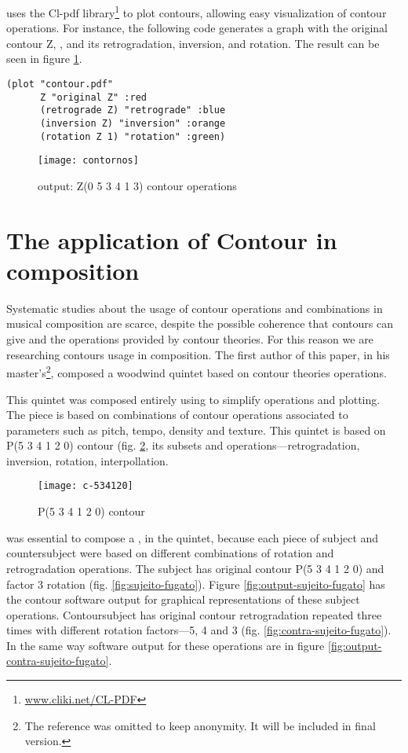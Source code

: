 \goiaba{} uses the Cl-pdf library\footnote{\url{www.cliki.net/CL-PDF}}
to plot contours, allowing easy visualization of contour operations.
For instance, the following code generates a graph with the original
contour Z, , and its retrogradation, inversion,
and rotation. The result can be seen in figure \ref{fig:operacoes}.

\begin{verbatim}
(plot "contour.pdf"
      Z "original Z" :red
      (retrograde Z) "retrograde" :blue
      (inversion Z) "inversion" :orange
      (rotation Z 1) "rotation" :green)
\end{verbatim}

\begin{figure}
  \centering
  \texttt{[image: contornos]}
  \caption{\goiaba{} output: Z(0 5 3 4 1 3) contour operations}
  \label{fig:operacoes}
\end{figure}


\section{The application of Contour in composition}
\label{sec:cont-appl-comp}

Systematic studies about the usage of contour operations and
combinations in musical composition are scarce, despite the possible
coherence that contours can give and the operations provided by
contour theories. For this reason we are researching contours usage in
composition. The first author of this paper, in his
master's\footnote{The reference was omitted to keep anonymity. It will
  be included in final version.}, composed a woodwind quintet based on
contour theories operations.

This quintet was composed entirely using \goiaba{} to simplify
operations and plotting. The piece is based on combinations of contour
operations associated to parameters such as pitch, tempo, density and
texture. This quintet is based on P(5 3 4 1 2 0) contour
(fig. \ref{fig:c-534120}, its subsets and operations---retrogradation,
inversion, rotation, interpollation.

\begin{figure}
  \centering
  \texttt{[image: c-534120]}
  \caption{P(5 3 4 1 2 0) contour}
  \label{fig:c-534120}
\end{figure}

\goiaba{} was essential to compose a , in the quintet,
because each piece of subject and countersubject were based on
different combinations of rotation and retrogradation operations.  The
subject has original contour P(5 3 4 1 2 0) and factor 3 rotation
(fig. \ref{fig:sujeito-fugato}). Figure
\ref{fig:output-sujeito-fugato} has the contour software output for
graphical representations of these subject operations. Contoursubject
has original contour retrogradation repeated three times with
different rotation factors---5, 4 and 3
(fig. \ref{fig:contra-sujeito-fugato}). In the same way software
output for these operations are in figure
\ref{fig:output-contra-sujeito-fugato}.

